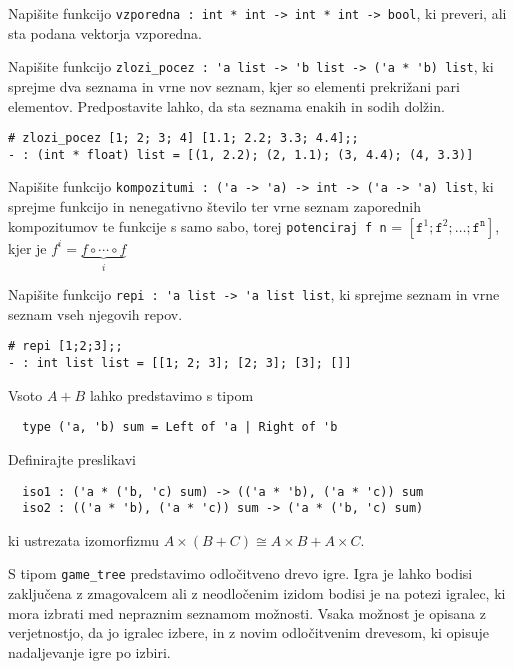 \documentclass[arhiv]{../izpit}
\begin{document}


\naloga

\podnaloga
Napišite funkcijo \verb|vzporedna : int * int -> int * int -> bool|, ki preveri, ali sta podana vektorja vzporedna.

\podnaloga
Napišite funkcijo \verb|zlozi_pocez : 'a list -> 'b list -> ('a * 'b) list|, ki sprejme dva seznama in vrne nov seznam, kjer so elementi prekrižani pari elementov. Predpostavite lahko, da sta seznama enakih in sodih dolžin.

\begin{verbatim}
# zlozi_pocez [1; 2; 3; 4] [1.1; 2.2; 3.3; 4.4];;
- : (int * float) list = [(1, 2.2); (2, 1.1); (3, 4.4); (4, 3.3)]
\end{verbatim}

\podnaloga
Napišite funkcijo \verb|kompozitumi : ('a -> 'a) -> int -> ('a -> 'a) list|, ki sprejme funkcijo in nenegativno število ter vrne seznam zaporednih kompozitumov te funkcije s samo sabo, torej \verb|potenciraj f n| = $[\mathtt{f}^1; \mathtt{f}^2; \dots; \mathtt{f}^\mathtt{n}]$, kjer je $f^i = \underbrace{f \circ \cdots \circ f}_i$

\podnaloga
Napišite funkcijo \verb|repi : 'a list -> 'a list list|, ki sprejme seznam in vrne seznam vseh njegovih repov.
\begin{verbatim}
# repi [1;2;3];;
- : int list list = [[1; 2; 3]; [2; 3]; [3]; []]
\end{verbatim}

\podnaloga
Vsoto $A + B$ lahko predstavimo s tipom
\begin{verbatim}
  type ('a, 'b) sum = Left of 'a | Right of 'b
\end{verbatim}
Definirajte preslikavi
\begin{verbatim}
  iso1 : ('a * ('b, 'c) sum) -> (('a * 'b), ('a * 'c)) sum
  iso2 : (('a * 'b), ('a * 'c)) sum -> ('a * ('b, 'c) sum)
\end{verbatim}
ki ustrezata izomorfizmu $A \times (B + C) \cong A \times B + A \times C$.


\naloga

S tipom \verb|game_tree| predstavimo odločitveno drevo igre. Igra je lahko bodisi zaključena z zmagovalcem ali z neodločenim izidom bodisi je na potezi igralec, ki mora izbrati med nepraznim seznamom možnosti. Vsaka možnost je opisana z verjetnostjo, da jo igralec izbere, in z novim odločitvenim drevesom, ki opisuje nadaljevanje igre po izbiri.
\end{document}
